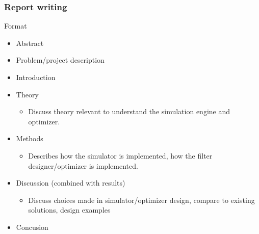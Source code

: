 \documentclass[t, screen, aspectratio=43]{beamer}
\begin{document}
\begin{frame}
	\frametitle{Report writing}
	\begin{block}{Format}
		\begin{itemize}
			\scriptsize
			\item Abstract
			\item Problem/project description
			\item Introduction
			\item Theory
			\begin{itemize}
				\scriptsize
				\item Discuss theory relevant to understand the simulation engine and optimizer.
			\end{itemize}
			\item Methods
			\begin{itemize}
				\scriptsize
				\item Describes how the simulator is implemented, how the filter designer/optimizer is implemented.
			\end{itemize}
			\item Discussion (combined with results)
			\begin{itemize}
				\scriptsize 
				\item Discuss choices made in simulator/optimizer design, compare to existing solutions, design examples
			\end{itemize}
			\item Concusion
		\end{itemize}    
	\end{block}
\end{frame}
\end{document}
